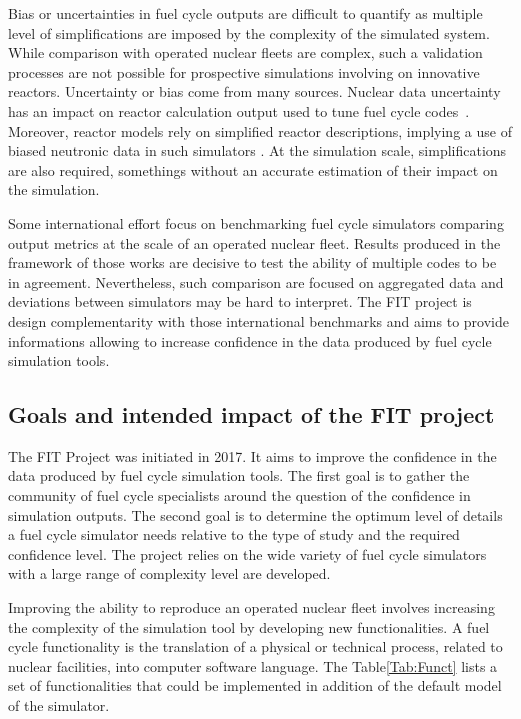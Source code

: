 Bias or uncertainties in fuel cycle outputs are difficult to quantify as
multiple level of simplifications are imposed by the complexity of the simulated
system. While comparison with operated nuclear fleets are complex, such a
validation processes are not possible for prospective simulations involving on
innovative reactors. Uncertainty or bias come from many sources. Nuclear data
uncertainty has an impact on reactor calculation output used to tune fuel cycle
codes~\cite{Krivtchik_2014}. Moreover, reactor models rely on simplified reactor
descriptions, implying a use of biased neutronic data in such simulators
\cite{Somaini_2017}.  At the simulation scale, simplifications are also
required, somethings without an accurate estimation of their impact on the
simulation. 


Some international effort \cite{NEA2016} focus on benchmarking fuel cycle
simulators comparing output metrics at the scale of an operated nuclear fleet.
Results produced in the framework of those works are decisive to test the
ability of multiple codes to be in agreement. Nevertheless, such comparison are
focused on aggregated data and deviations between simulators may be hard to
interpret. The FIT project is design complementarity with those international
benchmarks and aims to provide informations allowing to increase confidence in
the data produced by fuel cycle simulation tools.

\subsection{Goals and intended impact of the FIT project}

The FIT Project was initiated in 2017. It aims to improve the confidence in the
data produced by fuel cycle simulation tools. The first goal is to gather the
community of fuel cycle specialists around the question of the confidence in
simulation outputs. The second goal is to determine the optimum level of details
a fuel cycle simulator needs relative to the type of study and the required
confidence level. The project relies on the wide variety of fuel cycle
simulators with a large range of complexity level are developed.

Improving the ability to reproduce an operated nuclear fleet involves increasing
the complexity of the simulation tool by developing new functionalities. A fuel
cycle functionality is the translation of a physical or technical process,
related to nuclear facilities, into computer software language. The
Table\ref{Tab:Funct} lists a set of functionalities that could be implemented
in addition of the default model of the simulator.

